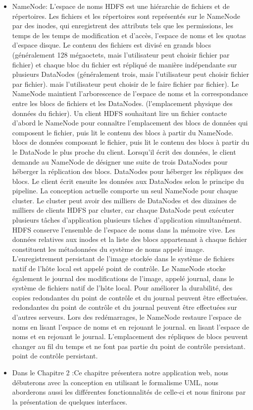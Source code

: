 \documentclass{report}
\begin{document}
\begin{itemize}
 \item NameNode: L'espace de noms HDFS est une hiérarchie de fichiers et de répertoires. Les fichiers et les répertoires sont représentés sur le NameNode par des inodes, qui enregistrent des attributs tels que les permissions, les temps de les temps de modification et d'accès, l'espace de noms et les quotas d'espace disque. 
 Le contenu des fichiers est divisé en grands blocs (généralement 128 mégaoctets, mais l'utilisateur peut choisir fichier par fichier) et chaque bloc du fichier est répliqué de manière indépendante sur plusieurs DataNodes (généralement trois, mais l'utilisateur peut choisir fichier par fichier).
mais l'utilisateur peut choisir de le faire fichier par fichier). Le NameNode maintient l'arborescence de l'espace de noms et la correspondance entre les blocs de fichiers et les DataNodes.
(l'emplacement physique des données du fichier). Un client HDFS souhaitant
lire un fichier contacte d'abord le NameNode pour connaître l'emplacement des blocs de données qui composent le fichier, puis lit le contenu des blocs à partir du NameNode.
blocs de données composant le fichier, puis lit le contenu des blocs à partir du
le DataNode le plus proche du client. Lorsqu'il écrit des données, le client demande au NameNode de désigner une suite de trois DataNodes pour héberger la réplication des blocs.
DataNodes pour héberger les répliques des blocs. Le client écrit ensuite
les données aux DataNodes selon le principe du pipeline. La conception actuelle
comporte un seul NameNode pour chaque cluster. Le cluster peut avoir
des milliers de DataNodes et des dizaines de milliers de clients HDFS
par cluster, car chaque DataNode peut exécuter plusieurs tâches d'application
plusieurs tâches d'application simultanément.
HDFS conserve l'ensemble de l'espace de noms dans la mémoire vive. Les données relatives aux inodes
et la liste des blocs appartenant à chaque fichier constituent les métadonnées du système de noms appelé image. L'enregistrement persistant
de l'image stockée dans le système de fichiers natif de l'hôte local est
appelé point de contrôle. Le NameNode stocke également le journal des modifications de l'image, appelé journal, dans le système de fichiers natif de l'hôte local. Pour améliorer la durabilité, des copies redondantes du point de contrôle et du journal peuvent être effectuées.
redondantes du point de contrôle et du journal peuvent être effectuées sur d'autres serveurs. Lors des redémarrages, le NameNode restaure l'espace de noms en lisant l'espace de noms et en rejouant le journal.
en lisant l'espace de noms et en rejouant le journal. L'emplacement des
répliques de blocs peuvent changer au fil du temps et ne font pas partie du point de contrôle persistant.
point de contrôle persistant.



\item Dans le Chapitre 2 :Ce chapitre présentera notre application web, nous débuterons avec la conception en utilisant le formalisme UML, nous aborderons aussi les différentes fonctionnalités de celle-ci et nous finirons par la présentation de quelques interfaces.

\end{itemize}
\end{document}
